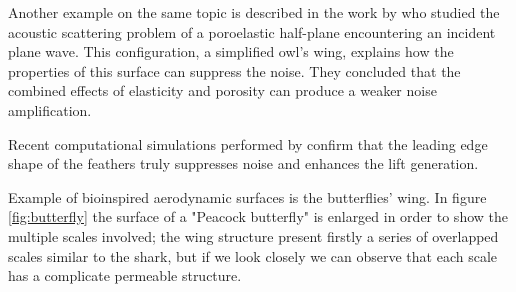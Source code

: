 Another example on the same topic is described in the work by \citet{jaworski2013aerodynamic} who studied the acoustic scattering problem of a poroelastic half-plane encountering an incident plane wave.
This configuration, a simplified owl's wing, explains how the properties of this surface can suppress the noise.
They concluded that the combined effects of elasticity and porosity can produce a weaker noise amplification.

Recent computational simulations performed by \citet{rao2017owl} confirm that the leading edge shape of the feathers truly suppresses noise and enhances the lift generation.

Example of bioinspired aerodynamic surfaces is the butterflies' wing.
In figure \ref{fig:butterfly} the surface of a "Peacock butterfly" is enlarged in order to show the multiple scales involved; the wing structure present firstly a series of overlapped scales similar to the shark, but if we look closely we can observe that each scale has a complicate permeable structure.


